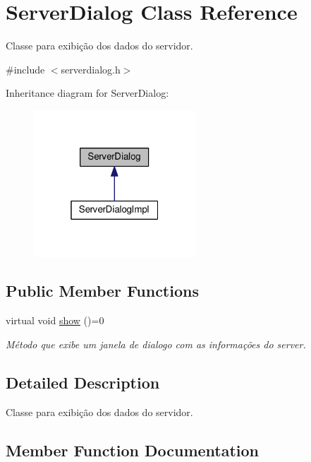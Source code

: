 \hypertarget{classServerDialog}{}\section{Server\+Dialog Class Reference}
\label{classServerDialog}


Classe para exibição dos dados do servidor.  




{\ttfamily \#include $<$serverdialog.\+h$>$}



Inheritance diagram for Server\+Dialog\+:
\nopagebreak
\begin{figure}[H]
\begin{center}
\leavevmode
\includegraphics[width=172pt]{d2/d7c/classServerDialog__inherit__graph}
\end{center}
\end{figure}
\subsection*{Public Member Functions}
\begin{DoxyCompactItemize}
\item 
virtual void \hyperlink{classServerDialog_a79906f2c91c29b2504c2cb370d302b00}{show} ()=0
\begin{DoxyCompactList}\small\item\em Método que exibe um janela de dialogo com as informações do server. \end{DoxyCompactList}\end{DoxyCompactItemize}


\subsection{Detailed Description}
Classe para exibição dos dados do servidor. 

\subsection{Member Function Documentation}
